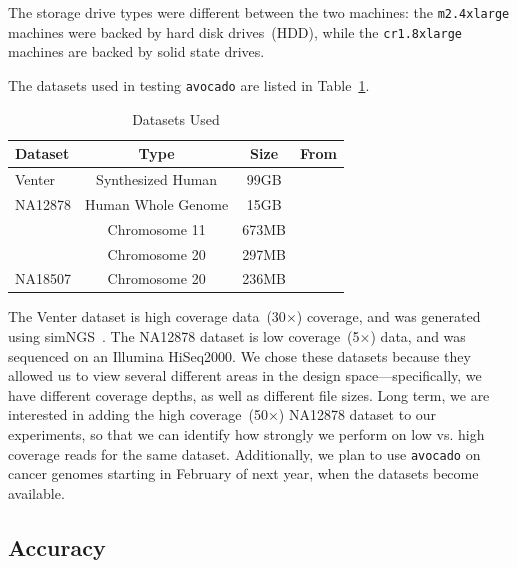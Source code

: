 \documentclass{acm_proc_article-sp}
\begin{document}
\addtocounter{footnote}{-1}
\addtocounter{footnote}{1}

The storage drive types were different between the two machines: the \texttt{m2.4xlarge} machines were backed by hard disk drives~(HDD),
while the \texttt{cr1.8xlarge} machines are backed by solid state drives.

The datasets used in testing \texttt{avocado} are listed in Table~\ref{tab:datasets}.

\begin{table}[h]
\caption{Datasets Used}
\begin{center}
\begin{tabular}{| l || c | c | c |}
\hline
\bf Dataset & \bf Type & \bf Size & \bf From \\
\hline
\hline
Venter & Synthesized Human & 99GB & \cite{talwalkar13} \\
\hline
NA12878 & Human Whole Genome & 15GB & \cite{siva08} \\
 & Chromosome 11 & 673MB & \cite{siva08} \\
 & Chromosome 20 & 297MB & \cite{siva08} \\
 \hline
 NA18507 & Chromosome 20 & 236MB & \cite{siva08} \\
\hline
\end{tabular}
\end{center}
\label{tab:datasets}
\end{table}

The Venter dataset is high coverage data~(30$\times$) coverage, and was generated using simNGS~\cite{massingham12}. The NA12878
dataset is low coverage~(5$\times$) data, and was sequenced on an Illumina HiSeq2000. We chose these datasets because they allowed us
to view several different areas in the design space---specifically, we have different coverage depths, as well as different file sizes. Long term,
we are interested in adding the high coverage~(50$\times$) NA12878 dataset to our experiments, so that we can identify how strongly we
perform on low vs. high coverage reads for the same dataset. Additionally, we plan to use \texttt{avocado} on cancer genomes starting in
February of next year, when the datasets become available.

\subsection{Accuracy}
\label{sec:accuracy}
\end{document}
